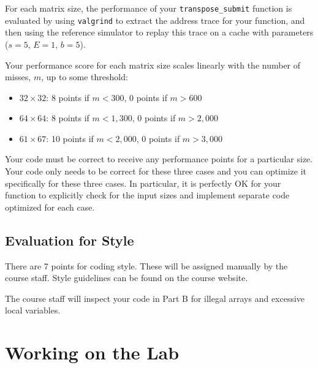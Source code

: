 \documentclass[11pt]{article}
\begin{document}
For each matrix size, the performance of your \verb:transpose_submit:
function is evaluated by using {\tt valgrind} to extract the address
trace for your function, and then using the reference simulator to
replay this trace on a cache with parameters ($s=5$, $E=1$, $b=5$).

Your performance score for each matrix size scales linearly with the
 number of misses, $m$, up to some threshold:

\begin{itemize}
\item $32 \times 32$: 8 points if $m < 300$, 0 points if $m > 600$
\item $64 \times 64$: 8 points if $m < 1,300$, 0 points if $m > 2,000$
\item $61 \times 67$: 10 points if $m < 2,000$, 0 points if $m > 3,000$
\end{itemize}

Your code must be correct to receive any performance points for a particular size.
Your code only needs to be correct for these three cases and you can
optimize it specifically for these three cases. In particular, it is
perfectly OK for your function to explicitly check for the input sizes
and implement separate code optimized for each case.


\subsection{Evaluation for Style}
There are 7 points for coding style. These will be assigned manually
by the course staff.  Style guidelines can be found on the course
website.

The course staff will inspect your code in Part B for illegal arrays
and excessive local variables.

\section{Working on the Lab}
\end{document}
